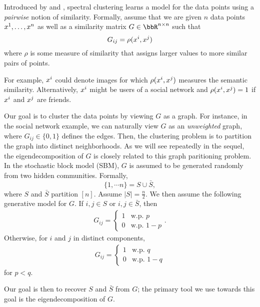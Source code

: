 Introduced by \citet{shi2000normalized} and \citet{ng2001spectral}, spectral clustering learns a model for the data points using a \emph{pairwise} notion of similarity. Formally, assume that we are given $n$ data points $x\sp{1}, \dots, x\sp{n}$ as well as a similarity matrix $G \in \bbR^{n\times n}$ such that 
\begin{equation}
    G_{ij} = \rho (x\sp{i}, x\sp{j})
\end{equation}
where $\rho$ is some measure of similarity that assigns larger values to more similar pairs of points. 

For example, $x\sp{i}$ could denote images for which $\rho (x\sp{i}, x\sp{j})$ measures the semantic similarity. Alternatively, $x\sp{i}$ might be users of a social network and $\rho (x\sp{i}, x\sp{j}) = 1$ if $x\sp{i}$ and $x\sp{j}$ are friends. 

Our goal is to cluster the data points by viewing $G$ as a graph. For instance, in the social network example, we can naturally view $G$ as an \emph{unweighted} graph, where $G_{ij} \in \{0, 1\}$ defines the edges. Then, the clustering problem is to partition the graph into distinct neighborhoods. As we will see repeatedly in the sequel, the eigendecomposition of $G$ is closely related to this graph paritioning problem.
In the stochastic block model (SBM), $G$ is assumed to be generated randomly from two hidden communities. Formally, 
\begin{equation}
    \{ 1, \cdots n \} = S \cup \bar{S},
\end{equation}
where $S$ and $\bar{S}$ partition $[n]$. Assume $|S| = \frac{n}{2}$. We then assume the following generative model for $G$. 
If $i,j \in S$ or $i,j \in \bar{S}$, then 
\begin{align}
    G_{ij} = \begin{cases}
        1 &\text{w.p. $p$} \\
        0 &\text{w.p. $1-p$} \end{cases}.
\end{align} 
Otherwise, for $i$ and $j$ in distinct components, 
\begin{align}
    G_{ij} = \begin{cases}
        1 &\text{w.p. $q$} \\
        0 &\text{w.p. $1-q$} \end{cases}
\end{align} 
for $p < q$.

Our goal is then to recover $S$ and $\bar{S}$ from $G$; the primary tool we use towards this goal is the eigendecomposition of $G$.

